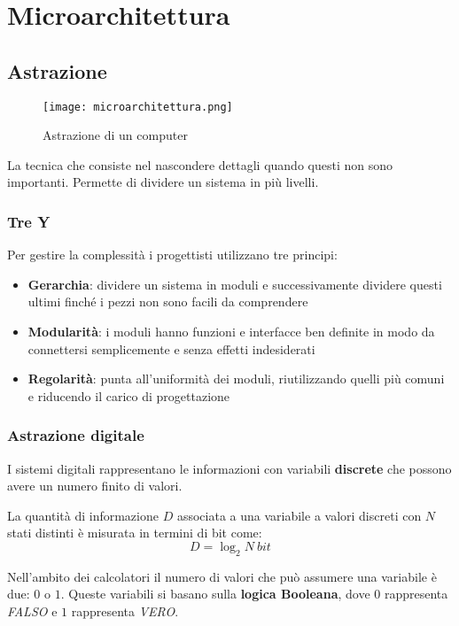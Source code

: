 \newpage
\section{Microarchitettura}
\subsection{Astrazione}
\begin{wrapfigure}{r}{0.25\textwidth}
	\texttt{[image: microarchitettura.png]}
	\caption{Astrazione di un computer}
\end{wrapfigure}
\begin{definition}[Astrazione]
	La tecnica che consiste nel nascondere dettagli quando questi non sono importanti. Permette di dividere un sistema in più livelli.
\end{definition}

\subsubsection{Tre Y}
Per gestire la complessità i progettisti utilizzano tre principi:
\begin{itemize}
	\item \textbf{Gerarchia}: dividere un sistema in moduli e successivamente dividere questi ultimi finché i pezzi non sono facili da comprendere
	\item \textbf{Modularità}: i moduli hanno funzioni e interfacce ben definite in modo da connettersi semplicemente e senza effetti indesiderati
	\item \textbf{Regolarità}: punta all'uniformità dei moduli, riutilizzando quelli più comuni e riducendo il carico di progettazione
\end{itemize}

\subsubsection{Astrazione digitale}
I sistemi digitali rappresentano le informazioni con variabili \textbf{discrete} che possono avere un numero finito di valori.
\begin{definition}
	La quantità di informazione $D$ associata a una variabile a valori discreti con $N$ stati distinti è misurata in termini di bit come:
	\begin{equation}
		D = \log_2 N \: bit
	\end{equation}
\end{definition}
Nell'ambito dei calcolatori il numero di valori che può assumere una variabile è due: $0$ o $1$. Queste variabili si basano sulla \textbf{logica Booleana}, dove $0$ rappresenta \textit{FALSO} e $1$ rappresenta \textit{VERO}.

